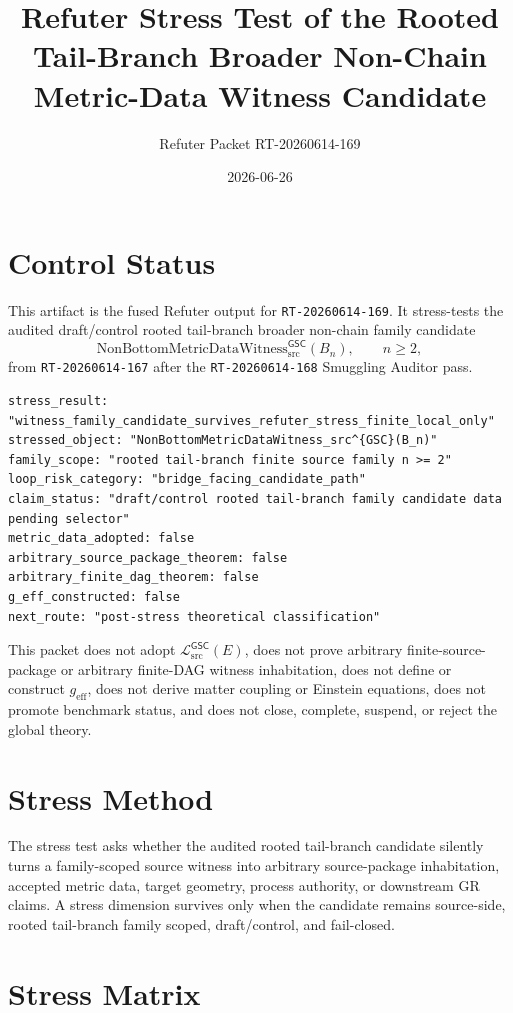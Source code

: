 \documentclass[11pt]{article}
\title{Refuter Stress Test of the Rooted Tail-Branch Broader Non-Chain Metric-Data Witness Candidate}
\author{Refuter Packet RT-20260614-169}
\date{2026-06-26}
\newcommand{\Witness}{\mathrm{NonBottomMetricDataWitness}_{\mathrm{src}}^{\mathsf{GSC}}}
\newcommand{\MetricData}{\mathcal{L}_{\mathrm{src}}^{\mathsf{GSC}}}
\newcommand{\geff}{g_{\mathrm{eff}}}
\newcommand{\Bn}{B_n}
\begin{document}
\maketitle

\section{Control Status}

This artifact is the fused Refuter output for \texttt{RT-20260614-169}. It
stress-tests the audited draft/control rooted tail-branch broader non-chain
family candidate
\[
  \Witness(\Bn),\qquad n\ge 2,
\]
from \texttt{RT-20260614-167} after the \texttt{RT-20260614-168} Smuggling
Auditor pass.

\begin{verbatim}
stress_result: "witness_family_candidate_survives_refuter_stress_finite_local_only"
stressed_object: "NonBottomMetricDataWitness_src^{GSC}(B_n)"
family_scope: "rooted tail-branch finite source family n >= 2"
loop_risk_category: "bridge_facing_candidate_path"
claim_status: "draft/control rooted tail-branch family candidate data pending selector"
metric_data_adopted: false
arbitrary_source_package_theorem: false
arbitrary_finite_dag_theorem: false
g_eff_constructed: false
next_route: "post-stress theoretical classification"
\end{verbatim}

This packet does not adopt \(\MetricData(E)\), does not prove arbitrary
finite-source-package or arbitrary finite-DAG witness inhabitation, does not
define or construct \(\geff\), does not derive matter coupling or Einstein
equations, does not promote benchmark status, and does not close, complete,
suspend, or reject the global theory.

\section{Stress Method}

The stress test asks whether the audited rooted tail-branch candidate silently
turns a family-scoped source witness into arbitrary source-package
inhabitation, accepted metric data, target geometry, process authority, or
downstream GR claims. A stress dimension survives only when the candidate
remains source-side, rooted tail-branch family scoped, draft/control, and
fail-closed.

\section{Stress Matrix}
\end{document}
